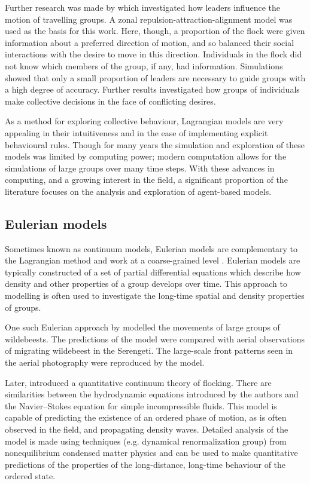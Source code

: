 Further research was made by \citet{couzin05} which investigated how leaders influence the motion of travelling groups. A zonal repulsion-attraction-alignment model was used as the basis for this work. Here, though, a proportion of the flock were given information about a preferred direction of motion, and so balanced their social interactions with the desire to move in this direction. Individuals in the flock did not know which members of the group, if any, had information. Simulations showed that only a small proportion of leaders are necessary to guide groups with a high degree of accuracy. Further results investigated how groups of individuals make collective decisions in the face of conflicting desires.

As a method for exploring collective behaviour, Lagrangian models are very appealing in their intuitiveness and in the ease of implementing explicit behavioural rules. Though for many years the simulation and exploration of these models was limited by computing power; modern computation allows for the simulations of large groups over many time steps. With these advances in computing, and a growing interest in the field, a significant proportion of the literature focuses on the analysis and exploration of agent-based models.

\subsection{Eulerian models}
\label{ssec:eulerian_models}

Sometimes known as continuum models, Eulerian models are complementary to the Lagrangian method and work at a coarse-grained level \citep{giardina08}. Eulerian models are typically constructed of a set of partial differential equations which describe how density and other properties of a group develops over time. This approach to modelling is often used to investigate the long-time spatial and density properties of groups.

One such Eulerian approach by \citet{gueron93} modelled the movements of large groups of wildebeests. The predictions of the model were compared with aerial observations of migrating wildebeest in the Serengeti. The large-scale front patterns seen in the aerial photography were reproduced by the model.

Later, \citet{toner98} introduced a quantitative continuum theory of flocking. There are similarities between the hydrodynamic equations introduced by the authors and the Navier--Stokes equation for simple incompressible fluids. This model is capable of predicting the existence of an ordered phase of motion, as is often observed in the field, and propagating density waves. Detailed analysis of the model is made using techniques (e.g. dynamical renormalization group) from nonequilibrium condensed matter physics and can be used to make quantitative predictions of the properties of the long-distance, long-time behaviour of the ordered state.

